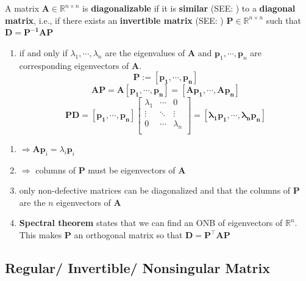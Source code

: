 A matrix $\mathbf{A} \in \mathbb{R}^{n\times n}$ is \textbf{diagonalizable} if it is \textbf{similar} (SEE: ) to a \textbf{diagonal matrix}, i.e., if there exists an \textbf{invertible matrix} (SEE: ) $\mathbf{P} \in \mathbb{R}^{n\times n}$ such that $\mathbf{D = P^{-1}AP}$

\begin{enumerate}
    \item if and only if $\lambda_1, \cdots , \lambda_n$ are the eigenvalues of $\mathbf{A}$ and $\mathbf{p}_1, \cdots , \mathbf{p}_n$ are corresponding eigenvectors of $\mathbf{A}$.
\[
    \mathbf{P := [p_1, \cdots , p_n]}
\]
\[
    \mathbf{AP = A[p_1, \cdots , p_n] = [Ap_1, \cdots , Ap_n]}
\]
\[
    \mathbf{PD} = \mathbf{[p_1, \cdots , p_n]}\begin{bmatrix}
        \lambda_1 & \cdots & 0 \\
        \vdots & \ddots & \vdots \\
        0 & \cdots & \lambda_n \\
    \end{bmatrix} = \mathbf{[\lambda_1 p_1, \cdots ,\lambda_n p_n]}
\]
    
\end{enumerate}
\begin{enumerate}
    \item[] $\Rightarrow \mathbf{Ap}_i = \lambda_i \mathbf{p}_i$

    \item[] $\Rightarrow$ columns of $\mathbf{P}$ must be eigenvectors of $\mathbf{A}$

    \item only non-defective matrices can be diagonalized and that the columns of $\mathbf{P}$ are the $n$ eigenvectors of $\mathbf{A}$

    \item \textbf{Spectral theorem} states that we can find an ONB of eigenvectors of $\mathbb{R}^n$. This makes $\mathbf{P}$ an orthogonal matrix so that $\mathbf{D = P^\top AP}$
\end{enumerate}



\subsection{Regular/ Invertible/ Nonsingular Matrix \cite{mfml-1}} \label{Regular/ Invertible/ Nonsingular Matrix}

